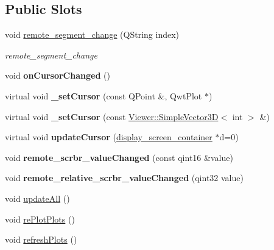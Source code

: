 \subsection*{Public Slots}
\begin{DoxyCompactItemize}
\item 
void \mbox{\hyperlink{classscreen__manager__ProjData_af999939294c1afe3d7cf218402599de7}{remote\+\_\+segment\+\_\+change}} (Q\+String index)
\begin{DoxyCompactList}\small\item\em remote\+\_\+segment\+\_\+change \end{DoxyCompactList}\item 
\mbox{\label{classscreen__manager__ProjData_a05a40e2c5e6272a531ba689764e1a413}} 
void {\bfseries on\+Cursor\+Changed} ()
\item 
\mbox{\label{classscreen__manager__ProjData_ad921b197a380634d679fb86bc342d032}} 
virtual void {\bfseries \+\_\+set\+Cursor} (const Q\+Point \&, Qwt\+Plot $\ast$)
\item 
\mbox{\label{classscreen__manager__ProjData_aed563d1a8aa51b0236c237e5c1e140c8}} 
virtual void {\bfseries \+\_\+set\+Cursor} (const \mbox{\hyperlink{classViewer_1_1SimpleVector3D}{Viewer\+::\+Simple\+Vector3D}}$<$ int $>$ \&)
\item 
\mbox{\label{classscreen__manager__ProjData_a6b39c66330e5fdc44c7871af0b37d2c4}} 
virtual void {\bfseries update\+Cursor} (\mbox{\hyperlink{classdisplay__screen__container}{display\+\_\+screen\+\_\+container}} $\ast$d=0)
\item 
\mbox{\label{classScreen__manager_ac91e8b023e12dc15f8c6ab1951b4ce70}} 
void {\bfseries remote\+\_\+scrbr\+\_\+value\+Changed} (const qint16 \&value)
\item 
\mbox{\label{classScreen__manager_acfda6fcca2edd2d2a155b000256dad56}} 
void {\bfseries remote\+\_\+relative\+\_\+scrbr\+\_\+value\+Changed} (qint32 value)
\item 
void \mbox{\hyperlink{classScreen__manager_afc206ddd1fee12c08d890d7a0c4c5fcb}{update\+All}} ()
\item 
void \mbox{\hyperlink{classScreen__manager_a0a17fba71b72fedefed5651b883ed371}{re\+Plot\+Plots}} ()
\item 
void \mbox{\hyperlink{classScreen__manager_a846061886a15cdc0de881976564b02f2}{refresh\+Plots}} ()
\end{DoxyCompactItemize}
